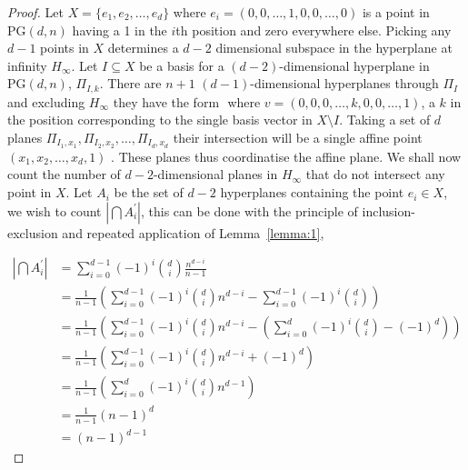 \documentclass{article}
\newcommand{\PG}{\mathrm{PG}}
\begin{document}
\begin{proof}
  Let \(X = \{e_{1}, e_{2}, \ldots, e_{d}\}\) where \(e_{i} = (0, 0, \ldots, 1, 0, 0, \ldots, 0)\) is a point in \(\PG(d, n)\) having a 1 in the \(i\)th position and zero everywhere else. Picking any \(d - 1\) points in \(X\) determines a \(d - 2\) dimensional subspace in the hyperplane at infinity \(H_{\infty}\). Let \(I \subseteq X\) be a basis for a \((d - 2)\)-dimensional hyperplane in \(\PG(d, n)\), \(\Pi_{I, k}\). There are \(n + 1\) \((d - 1)\)-dimensional hyperplanes through \(\Pi_{I}\) and excluding \(H_{\infty}\) they have the form \(<I, v>\) where \(v = (0, 0, 0, \ldots, k, 0, 0, \ldots, 1)\), a \(k\) in the position corresponding to the single basis vector in \(X \setminus I\). Taking a set of \(d\) planes \(\Pi_{I_{1}, x_{1}}, \Pi_{I_{2}, x_{2}}, \ldots, \Pi_{I_{d}, x_{d}}\)
  their intersection will be a single affine point \((x_{1}, x_{2}, \ldots, x_{d}, 1)\) . These planes thus coordinatise the affine plane. We shall now count the number of \(d - 2\)-dimensional planes in \(H_{\infty}\) that do not intersect any point in \(X\). Let \(A_{i}\) be the set of \(d - 2\) hyperplanes containing the point \(e_{i} \in X\), we wish to count \(|\bigcap A^{\prime}_{i}|\), this can be done with the principle of inclusion-exclusion and repeated application of Lemma~\ref{lemma:1},

  \begin{align*}
    |\bigcap A^{\prime}_{i}| &= \sum_{i = 0}^{d - 1} (-1)^{i} \binom{d}{i} \frac{n^{d - i}}{n - 1} \\
                  &= \frac{1}{n - 1}\left(\sum_{i = 0}^{d - 1}{(-1)}^{i} \binom{d}{i} n^{d - i} - \sum_{i = 0}^{d - 1} {(-1)}^{i} \binom{d}{i}\right) \\
                  &= \frac{1}{n - 1}\left(\sum_{i = 0}^{d - 1}{(-1)}^{i} \binom{d}{i} n^{d - i} - \left(\sum_{i = 0}^{d} {(-1)}^{i} \binom{d}{i} - {(-1)}^{d}\right)\right) \\
                  &= \frac{1}{n - 1}\left(\sum_{i = 0}^{d - 1}{(-1)}^{i} \binom{d}{i} n^{d - i} + {(-1)}^{d}\right) \\
                  &= \frac{1}{n - 1}\left(\sum_{i = 0}^{d}{(-1)}^{i} \binom{d}{i} n^{d - 1}\right) \\
                  &= \frac{1}{n - 1}(n - 1)^{d} \\
                  &= (n - 1)^{d - 1}
  \end{align*}


\end{proof}
\end{document}
